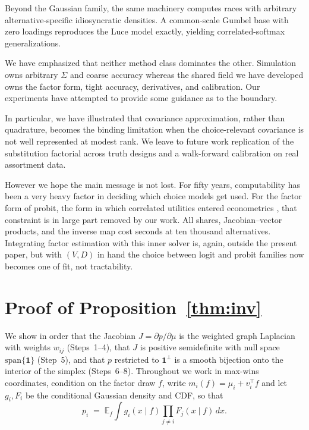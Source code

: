 \documentclass[12pt]{article}
\theoremstyle{remark}
\newcommand{\E}{\mathbb{E}}
\begin{document}
Beyond the Gaussian family, the same machinery computes races with arbitrary
alternative-specific idiosyncratic densities. A common-scale Gumbel base with
zero loadings reproduces the Luce model exactly, yielding correlated-softmax
generalizations.

We have emphasized that neither method class dominates the other. Simulation owns arbitrary
$\Sigma$ and coarse accuracy whereas the shared field we have developed owns the factor form,
tight accuracy, derivatives, and calibration. Our experiments have attempted to provide
some guidance as to the boundary. 

In particular, we have illustrated that covariance approximation, rather than quadrature,
becomes the binding limitation when the choice-relevant covariance is
not well represented at modest rank. We leave to future work
replication of the substitution factorial across truth designs and a
walk-forward calibration on real assortment data.

However we hope the main message is not lost. For fifty years, computability has been a very heavy factor in deciding which choice models get used. For
the factor form of probit, the form in which correlated utilities entered
econometrics \citep{hausman1978}, that constraint is in large part removed by our work. All shares, Jacobian--vector products, and
the inverse map cost seconds at ten thousand alternatives. Integrating
factor estimation with this inner solver is, again, outside the present paper,
but with $(V, D)$ in hand the choice
between logit and probit families now becomes one of fit, not tractability.

\appendix
\section{Proof of Proposition~\ref{thm:inv}}\label{app:inv}

We show in order that the Jacobian $J = \partial p/\partial\mu$ is the
weighted graph Laplacian with weights $w_{ij}$ (Steps~1--4), that $J$ is
positive semidefinite with null space $\mathrm{span}\{\mathbf{1}\}$
(Step~5), and that $p$ restricted to $\mathbf{1}^\perp$ is a smooth
bijection onto the interior of the simplex (Steps~6--8). Throughout we
work in max-wins coordinates, condition on the factor draw $f$, write
$m_i(f) = \mu_i + v_i^\top f$ and let $g_i, F_i$ be the conditional
Gaussian density and CDF, so that
\[
p_i \;=\; \E_f \int g_i(x\mid f)\prod_{j\ne i} F_j(x\mid f)\,dx .
\]
\end{document}
